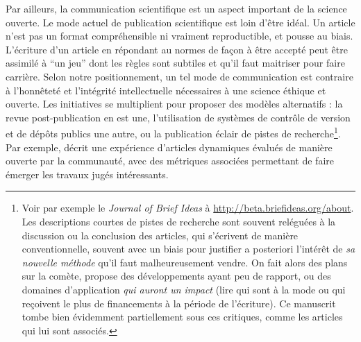 {Par ailleurs, la communication scientifique est un aspect important de la science ouverte. Le mode actuel de publication scientifique est loin d'être idéal. Un article n'est pas un format compréhensible ni vraiment reproductible, et pousse au biais. L'écriture d'un article en répondant au normes de façon à être accepté peut être assimilé à ``un jeu'' dont les règles sont subtiles et qu'il faut maitriser pour faire carrière. Selon notre positionnement, un tel mode de communication est contraire à l'honnêteté et l'intégrité intellectuelle nécessaires à une science éthique et ouverte. Les initiatives se multiplient pour proposer des modèles alternatifs : la revue post-publication en est une, l'utilisation de systèmes de contrôle de version et de dépôts publics une autre, ou la publication éclair de pistes de recherche\footnote{Voir par exemple le \emph{Journal of Brief Ideas} à \url{http://beta.briefideas.org/about}. Les descriptions courtes de pistes de recherche sont souvent reléguées à la discussion ou la conclusion des articles, qui s'écrivent de manière conventionnelle, souvent avec un biais pour justifier a posteriori l'intérêt de \emph{sa nouvelle méthode} qu'il faut malheureusement vendre. On fait alors des plans sur la comète, propose des développements ayant peu de rapport, ou des domaines d'application \emph{qui auront un impact} (lire qui sont à la mode ou qui reçoivent le plus de financements à la période de l'écriture). Ce manuscrit tombe bien évidemment partiellement sous ces critiques, comme les articles qui lui sont associés.}. Par exemple, \cite{bon2017novel} décrit une expérience d'articles dynamiques évalués de manière ouverte par la communauté, avec des métriques associées permettant de faire émerger les travaux jugés intéressants.
}



